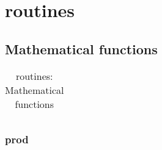 \chapter{routines\label{routines}}
\section{Mathematical functions}
\begin{table}
    \centering
    \caption{routines: Mathematical functions}
    \begin{tabular}{l}
        \hline
        \nameref{prod} \\
        \hline
    \end{tabular}
\end{table}
\subsection{prod\label{prod}}
